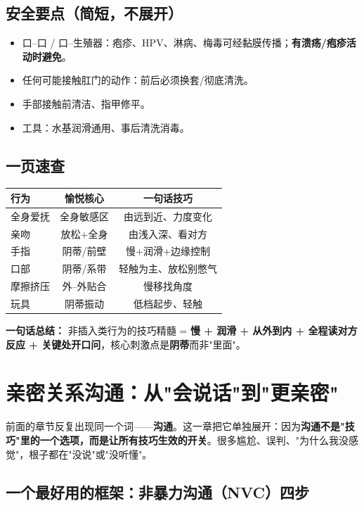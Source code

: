 \section{安全要点（简短，不展开）}

\begin{itemize}[leftmargin=2em,itemsep=0.3em]
  \item 口--口 / 口--生殖器：疱疹、HPV、淋病、梅毒可经黏膜传播；\textbf{有溃疡/疱疹活动时避免}。
  \item 任何可能接触肛门的动作：前后必须换套/彻底清洗。
  \item 手部接触前清洁、指甲修平。
  \item 工具：水基润滑通用、事后清洗消毒。
\end{itemize}

\section{一页速查}

\begin{tabularx}{\textwidth}{lCC}
\toprule
行为 & 愉悦核心 & 一句话技巧 \\
\midrule
全身爱抚 & 全身敏感区 & 由远到近、力度变化 \\
亲吻 & 放松+全身 & 由浅入深、看对方 \\
手指 & 阴蒂/前壁 & 慢+润滑+边缘控制 \\
口部 & 阴蒂/系带 & 轻触为主、放松别憋气 \\
摩擦挤压 & 外--外贴合 & 慢移找角度 \\
玩具 & 阴蒂振动 & 低档起步、轻触 \\
\bottomrule
\end{tabularx}

\vspace{1em}
\noindent\textbf{一句话总结：} 非插入类行为的技巧精髓 = \textbf{慢 + 润滑 + 从外到内 + 全程读对方反应 + 关键处开口问}，核心刺激点是\textbf{阴蒂}而非"里面"。

\chapter{亲密关系沟通：从"会说话"到"更亲密"}
\label{chap:communication}

前面的章节反复出现同一个词——\textbf{沟通}。这一章把它单独展开：因为\textbf{沟通不是"技巧"里的一个选项，而是让所有技巧生效的开关}。很多尴尬、误判、"为什么我没感觉"，根子都在"没说"或"没听懂"。

\section{一个最好用的框架：非暴力沟通（NVC）四步}

